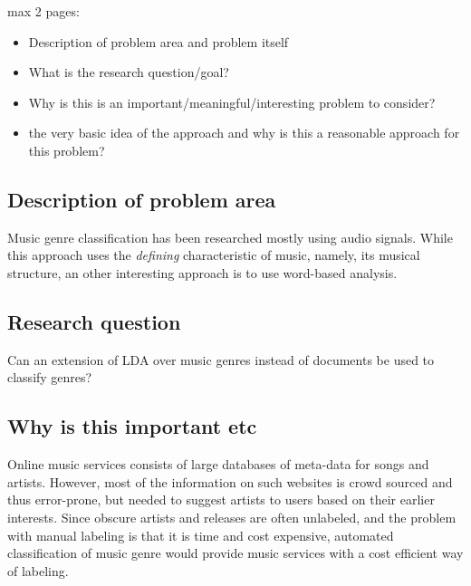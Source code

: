 max 2 pages:
\begin{itemize}
\item Description of problem area and problem itself
\item What is the research question/goal?
\item Why is this is an important/meaningful/interesting problem to consider?
\item the very basic idea of the approach and why is this a reasonable approach for this problem?
\end{itemize}

\subsection{Description of problem area}
Music genre classification has been researched mostly using audio signals. While this approach uses the \textit{defining} characteristic of music, namely, its musical structure, an other interesting approach is to use word-based analysis.

\subsection{Research question}
Can an extension of LDA over music genres instead of documents be used to classify genres?

\subsection{Why is this important etc}
Online music services consists of large databases of meta-data for songs and artists. However, most of the information on such websites is crowd sourced and thus error-prone, but needed to suggest artists to users based on their earlier interests. Since obscure artists and releases are often unlabeled, and the problem with manual labeling is that it is time and cost expensive, automated classification of music genre would provide music services with a cost efficient way of labeling.